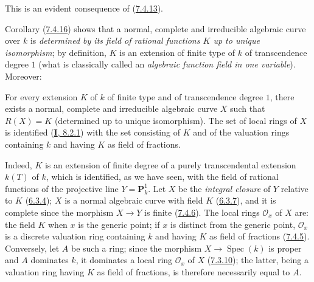 This is an evident consequence of (\hyperref[II.7.4.13]{7.4.13}).

\begin{env}[7.4.17]
\label{II.7.4.17}
Corollary (\hyperref[II.7.4.16]{7.4.16}) shows that a normal, complete
and irreducible algebraic curve over $k$ is \emph{determined by its field
of rational functions $K$ up to unique isomorphism}; by definition,
$K$ is an extension of finite type of $k$ of transcendence degree $1$ (what
is classically called an \emph{algebraic function field in one
variable}). Moreover:
\end{env}

\begin{proposition}[7.4.18]
\label{II.7.4.18}
For every extension $K$ of $k$ of finite type and of transcendence degree
$1$, there exists a normal, complete and irreducible algebraic curve $X$
such that $R(X)=K$ (determined up to unique isomorphism). The set of
local rings of $X$ is identified \textup{(\hyperref[I.8.2.1]{\textbf{I}, 8.2.1})} with
the set consisting of $K$ and of the valuation rings containing $k$ and having
$K$ as field of fractions.
\end{proposition}

Indeed, $K$ is an extension of finite degree of a purely transcendental
extension $k(T)$ of $k$, which is identified, as we have seen, with the field
of rational functions of the projective line $Y=\mathbf{P}_k^1$. Let $X$ be the
\emph{integral closure} of $Y$ relative to $K$
(\hyperref[II.6.3.4]{6.3.4}); $X$ is a normal algebraic curve with
field $K$ (\hyperref[II.6.3.7]{6.3.7}), and it is complete since the
morphism $X\to Y$ is finite (\hyperref[II.7.4.6]{7.4.6}). The local
rings $\mathcal{O}_x$ of $X$ are: the field $K$ when $x$ is the generic
point; if $x$ is distinct from the generic point, $\mathcal{O}_x$ is a
discrete valuation ring containing $k$ and having $K$ as field of
fractions (\hyperref[II.7.4.5]{7.4.5}). Conversely, let $A$ be such a
ring; since the morphism $X\to\operatorname{Spec}(k)$ is proper and
$A$ dominates $k$, it dominates a local ring $\mathcal{O}_x$ of $X$
(\hyperref[II.7.3.10]{7.3.10}); the latter, being a valuation ring
having $K$ as field of fractions, is therefore necessarily equal to $A$.

